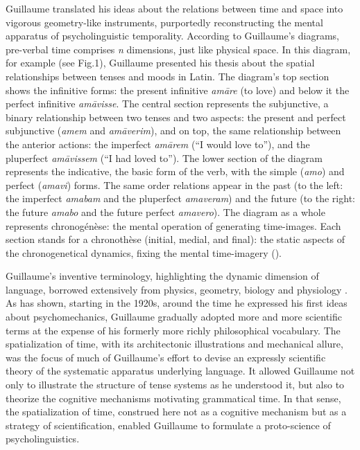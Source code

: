 \documentclass[output=paper]{langsci/langscibook}
\begin{document}
Guillaume translated his ideas about the relations between time and space into vigorous geometry-like instruments, purportedly reconstructing the mental apparatus of psycholinguistic temporality. According to Guillaume’s diagrams, pre-verbal time comprises \textit{n} dimensions, just like physical space. In this diagram, for example (see Fig.1), Guillaume presented his thesis about the spatial relationships between tenses and moods in Latin. The diagram’s top section shows the infinitive forms: the present infinitive \textit{am\textlatin{āre} }(to love) and below it the perfect infinitive \textit{am\textlatin{āvisse}}. The central section represents the subjunctive, a binary relationship between two tenses and two aspects: the present and perfect subjunctive (\textit{amem} and \textit{am\textlatin{āverim}}), and on top, the same relationship between the anterior actions: the imperfect \textit{am\textlatin{ārem}} (“I would love to”), and the pluperfect \textit{am\textlatin{āvissem} }(“I had loved to”). The lower section of the diagram represents the indicative, the basic form of the verb, with the simple (\textit{amo}) and perfect (\textit{amavi}) forms. The same order relations appear in the past (to the left: the imperfect \textit{amabam} and the pluperfect \textit{amaveram}) and the future (to the right: the future \textit{amabo} and the future perfect \textit{amavero}). The diagram as a whole represents chronogénèse: the mental operation of generating time\nobreakdash-images. Each section stands for a chronothèse (initial, medial, and final): the static aspects of the chronogenetical dynamics, fixing the mental time\nobreakdash-imagery (\citealt{boone_dictionnaire_1996}).

Guillaume’s inventive terminology, highlighting the dynamic dimension of language, borrowed extensively from physics, geometry, biology and physiology \citep{bottineau_terminologie_2006}. As \citet{valette_conceptualisation_2003} has shown, starting in the 1920s, around the time he expressed his first ideas about psychomechanics, Guillaume gradually adopted more and more scientific terms at the expense of his formerly more richly philosophical vocabulary. The spatialization of time, with its architectonic illustrations and mechanical allure, was the focus of much of Guillaume’s effort to devise an expressly scientific theory of the systematic apparatus underlying language. It allowed Guillaume not only to illustrate the structure of tense systems as he understood it, but also to theorize the cognitive mechanisms motivating grammatical time. In that sense, the spatialization of time, construed here not as a cognitive mechanism but as a strategy of scientification, enabled Guillaume to formulate a proto-science of psycholinguistics.
\end{document}
